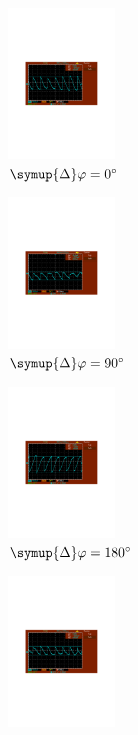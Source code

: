 \begin{figure} [H]
  \begin{subfigure}{0.48\textwidth}
    \centering
    \includegraphics[height=4cm]{content/Bilder/verrauscht/0.pdf}
    \caption{$\symup{\Delta}\varphi = \qty{0}{\degree}$}
  \end{subfigure}
  \begin{subfigure}{0.48\textwidth}
    \centering
    \includegraphics[height=4cm]{content/Bilder/verrauscht/90.pdf}
    \caption{$\symup{\Delta}\varphi = \qty{90}{\degree}$}
  \end{subfigure}
  \begin{subfigure}{0.48\textwidth}
    \centering
    \includegraphics[height=4cm]{content/Bilder/verrauscht/180.pdf}
    \caption{$\symup{\Delta}\varphi = \qty{180}{\degree}$}
  \end{subfigure}
  \begin{subfigure}{0.48\textwidth}
    \centering
    \includegraphics[height=4cm]{content/Bilder/verrauscht/270.pdf}

\end{subfigure}
\end{figure}
